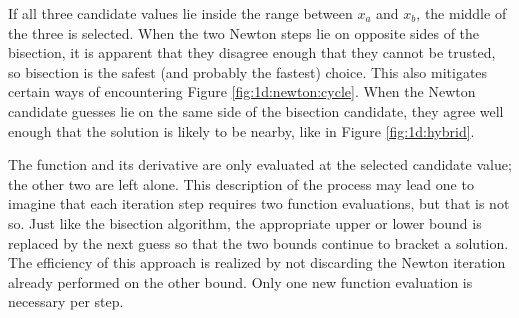\documentclass{article}
\begin{document}
If all three candidate values lie inside the range between $x_a$ and $x_b$, the middle of the three is selected.  When the two Newton steps lie on opposite sides of the bisection, it is apparent that they disagree enough that they cannot be trusted, so bisection is the safest (and probably the fastest) choice.  This also mitigates certain ways of encountering Figure \ref{fig:1d:newton:cycle}.  When the Newton candidate guesses lie on the same side of the bisection candidate, they agree well enough that the solution is likely to be nearby, like in Figure \ref{fig:1d:hybrid}.

The function and its derivative are only evaluated at the selected candidate value; the other two are left alone.  This description of the process may lead one to imagine that each iteration step requires two function evaluations, but that is not so.  Just like the bisection algorithm, the appropriate upper or lower bound is replaced by the next guess so that the two bounds continue to bracket a solution.  The efficiency of this approach is realized by not discarding the Newton iteration already performed on the other bound.  Only one new function evaluation is necessary per step.
\end{document}
